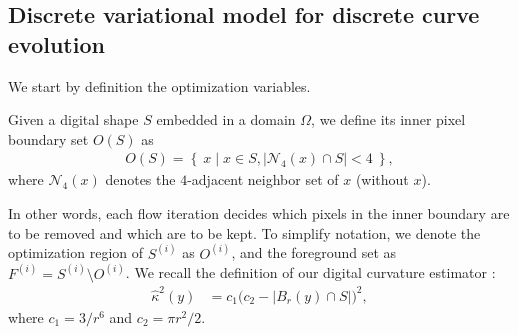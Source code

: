 \documentclass[runningheads]{llncs}
\begin{document}
\subsection{Discrete variational model for discrete curve evolution}

We start by definition the optimization variables.
\begin{definition}
Given a digital shape $S$ embedded in a domain $\Omega$, we define its inner pixel boundary set $O(S)$ as
\begin{align*}
	O(S) = \left\{ \: x \; | \; x \in S, |\mathcal{N}_4(x) \cap S|<4 \: \right\},
\end{align*}
where $\mathcal{N}_4(x)$ denotes the $4$-adjacent neighbor set of $x$ (without $x$).
\end{definition}

In other words, each flow iteration decides which pixels in the inner boundary are to be removed and which are to be kept. To simplify notation, we denote the optimization region of $S^{(i)}$ as $O^{(i)}$, and the foreground set as $F^{(i)} = S^{(i)} \setminus O^{(i)}$. We recall the definition of our digital curvature estimator :
\begin{align}
	\hat{\kappa}^2(y) &= c_1\Big( c_2 - | B_r(y) \cap S | \Big)^2, 
	\label{eq:curvature-estimator-pixels}
\end{align}
where $c_1=3/r^6$ and $c_2=\pi r^2/2$. 
\end{document}
